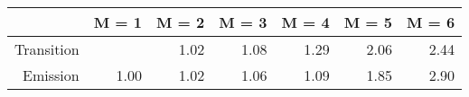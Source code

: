 \begin{table}[ht]
\centering
\begin{tabular}{rrrrrrr}
  \hline
 & M = 1 & M = 2 & M = 3 & M = 4 & M = 5 & M = 6 \\ 
  \hline
Transition &  & 1.02 & 1.08 & 1.29 & 2.06 & 2.44 \\ 
  Emission & 1.00 & 1.02 & 1.06 & 1.09 & 1.85 & 2.90 \\ 
   \hline
\end{tabular}
\end{table}
